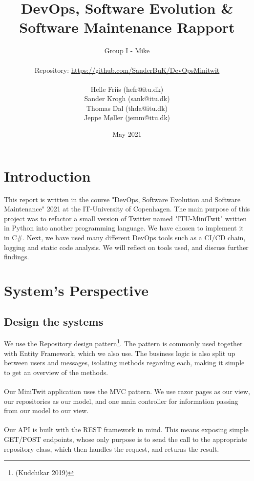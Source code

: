 \documentclass{article}
\title{DevOps, Software Evolution \& Software Maintenance Rapport}
\author{Group I - Mike\\\\
Repository: \url{https://github.com/SanderBuK/DevOpsMinitwit}
\\\\
Helle Friis (hefr@itu.dk)\\Sander Krogh (sank@itu.dk)\\Thomas Dal (thda@itu.dk)\\Jeppe Møller (jemm@itu.dk)}
\date{May 2021}
\begin{document}
\maketitle
\newpage
\tableofcontents
\newpage

\section{Introduction}
This report is written in the course "DevOps, Software Evolution and Software Maintenance" 2021 at the IT-University of Copenhagen.
The main purpose of this project was to refactor a small version of Twitter named "ITU-MiniTwit" written in Python into another programming language. We have chosen to implement it in C\#. Next, we have used many different DevOps tools such as a CI/CD chain, logging and static code analysis. We will reflect on tools used, and discuss further findings.



\section{System's Perspective}
\subsection{Design the systems}
We use the Repository design pattern\footnote{(Kudchikar 2019)}. The pattern is commonly used together with Entity Framework, which we also use. The business logic is also split up between users and messages, isolating methods regarding each, making it simple to get an overview of the methods.
\\\\
Our MiniTwit application uses the MVC pattern. We use razor pages as our view, our repositories as our model, and one main controller for information passing from our model to our view.
\\\\
Our API is built with the REST framework in mind. This means exposing simple GET/POST endpoints, whose only purpose is to send the call to the appropriate repository class, which then handles the request, and returns the result.
\end{document}
